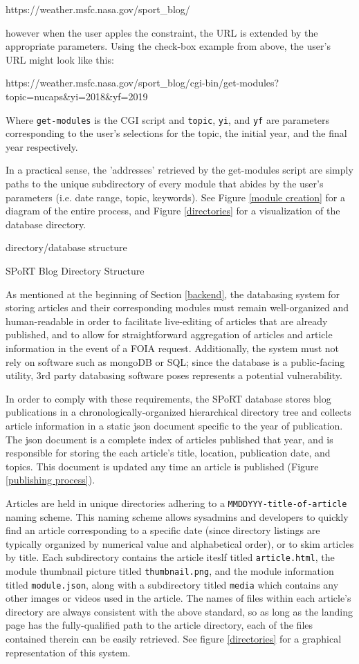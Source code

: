 https://weather.msfc.nasa.gov/sport\_blog/

however when the user apples the constraint, the URL is extended by the appropriate parameters. Using the check-box example from above, the user's URL might look like this:

  https://weather.msfc.nasa.gov/sport\_blog/cgi-bin/get-modules?topic=nucaps\&yi=2018\&yf=2019

Where \texttt{get-modules} is the CGI script and \texttt{topic}, \texttt{yi}, and \texttt{yf} are parameters corresponding to the user's selections for the topic, the initial year, and the final year respectively.

In a practical sense, the 'addresses' retrieved by the get-modules script are simply paths to the unique subdirectory of every module that abides by the user's parameters (i.e. date range, topic, keywords). See Figure \ref{module creation} for a diagram of the entire process, and Figure \ref{directories} for a visualization of the database directory.

directory/database structure

SPoRT Blog Directory Structure

As mentioned at the beginning of Section \ref{backend}, the databasing system for storing articles  and their corresponding modules must remain well-organized and human-readable in order to facilitate live-editing of articles that are already published, and to allow for straightforward aggregation of articles and article information in the event of a FOIA request. Additionally, the system must not rely on software such as mongoDB or SQL; since the database is a public-facing utility, 3rd party databasing software poses represents a potential vulnerability.

In order to comply with these requirements, the SPoRT database stores blog publications in a chronologically-organized hierarchical directory tree and collects article information in a static json document specific to the year of publication. The json document is a complete index of articles published that year, and is responsible for storing the each article's title, location, publication date, and topics. This document is updated any time an article is published (Figure \ref{publishing process}).

Articles are held in unique directories adhering to a \texttt{MMDDYYY-title-of-article}  naming scheme. This naming scheme allows sysadmins and developers to quickly find an article corresponding to a specific date (since directory listings are typically organized by numerical value and alphabetical order), or to skim articles by title. Each subdirectory contains the article iteslf titled \texttt{article.html}, the module thumbnail picture titled \texttt{thumbnail.png}, and the module information titled \texttt{module.json}, along with a subdirectory titled \texttt{media} which contains any other images or videos used in the article. The names of files within each article's directory are always consistent with the above standard, so as long as the landing page has the fully-qualified path to the article directory, each of the files contained therein can be easily retrieved. See figure \ref{directories} for a graphical representation of this system.

